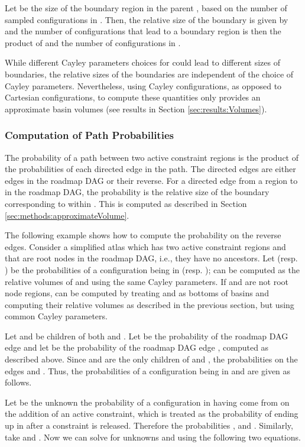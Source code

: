 \documentclass[]{article}
\begin{document}
Let  be the size of the  boundary region  in the parent
, based on the number of sampled configurations in . Then, the
relative size of the  boundary  is given by 
and the number of configurations that lead to a boundary region  is
then the product of  and the number of configurations in .

While different Cayley parameters choices for  could lead to different
sizes of boundaries, the relative sizes of the boundaries are independent of
the choice of Cayley parameters.  Nevertheless, using Cayley configurations, as
opposed to Cartesian configurations, to compute these quantities only provides
an approximate basin volumes (see results in Section \ref{sec:results:Volumes}).

\subsubsection{Computation of Path Probabilities}
\label{sec:methods:PathProb}
The probability of a path between two active constraint
regions is the product of the probabilities of each directed edge in the path.
The directed edges are either edges in the roadmap DAG or their reverse.
For a directed edge from a region  to  in the roadmap DAG, the probability
is the relative size of the boundary corresponding to  within . This is
computed as described in Section \ref{sec:methods:approximateVolume}.

The following example shows how to compute the probability on the reverse edges.
Consider a simplified atlas which has two active constraint regions  and 
that are root nodes in the roadmap DAG, i.e., they have no ancestors. 
Let  (resp. ) be the probabilities of a configuration being in  (resp. );
 can be computed as the relative volumes of  and  using the same Cayley parameters.
If  and  are not root node regions,  can be computed by treating  and  
as bottoms of basins and computing their relative volumes as described in the previous section, but
using common Cayley parameters.

Let  and  be children of both  and .
Let  be the probability of the roadmap DAG edge  and let  be the probability
of the roadmap DAG edge , computed as described above. 
Since  and  are the only children of  and
, the probabilities on the edges  and . Thus, the probabilities of a configuration being in  and  are given as follows.



Let  be the unknown the probability of a configuration in  having come from  on 
the addition of an active constraint, which is treated as the probability of ending up in  after a constraint is released.
Therefore the probabilities , and .
Similarly, take  and . Now we can solve for unknowns  and 
using the following two equations.
\end{document}
